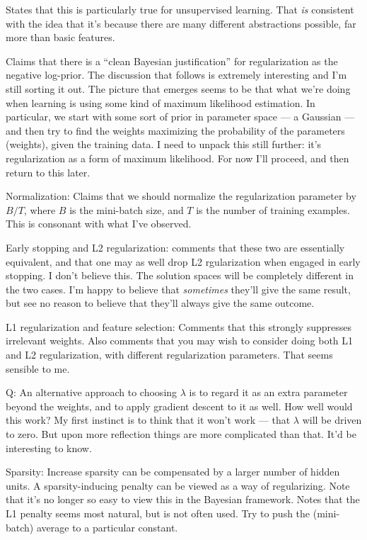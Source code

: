 \documentclass[12pt]{article}
\begin{document}
States that this is particularly true for unsupervised learning.  That
\emph{is} consistent with the idea that it's because there are many
different abstractions possible, far more than basic features.

Claims that there is a ``clean Bayesian justification'' for
regularization as the negative log-prior.  The discussion that follows
is extremely interesting and I'm still sorting it out.  The picture
that emerges seems to be that what we're doing when learning is using
some kind of maximum likelihood estimation.  In particular, we start
with some sort of prior in parameter space --- a Gaussian --- and then
try to find the weights maximizing the probability of the parameters
(weights), given the training data.  I need to unpack this still
further: it's regularization as a form of maximum likelihood.  For now
I'll proceed, and then return to this later.

Normalization: Claims that we should normalize the regularization
parameter by $B / T$, where $B$ is the mini-batch size, and $T$ is the
number of training examples.  This is consonant with what I've
observed.

Early stopping and L2 regularization: comments that these two are
essentially equivalent, and that one may as well drop L2 rgularization
when engaged in early stopping.  I don't believe this.  The solution
spaces will be completely different in the two cases.  I'm happy to
believe that \emph{sometimes} they'll give the same result, but see no
reason to believe that they'll always give the same outcome.

L1 regularization and feature selection: Comments that this strongly
suppresses irrelevant weights.  Also comments that you may wish to
consider doing both L1 and L2 regularization, with different
regularization parameters.  That seems sensible to me.

Q: An alternative approach to choosing $\lambda$ is to regard it as an
extra parameter beyond the weights, and to apply gradient descent to
it as well.  How well would this work?  My first instinct is to think
that it won't work --- that $\lambda$ will be driven to zero.  But
upon more reflection things are more complicated than that.  It'd be
interesting to know.

Sparsity: Increase sparsity can be compensated by a larger number of
hidden units.  A sparsity-inducing penalty can be viewed as a way of
regularizing.  Note that it's no longer so easy to view this in the
Bayesian framework.  Notes that the L1 penalty seems most natural, but
is not often used.  Try to push the (mini-batch) average to a
particular constant.
\end{document}
